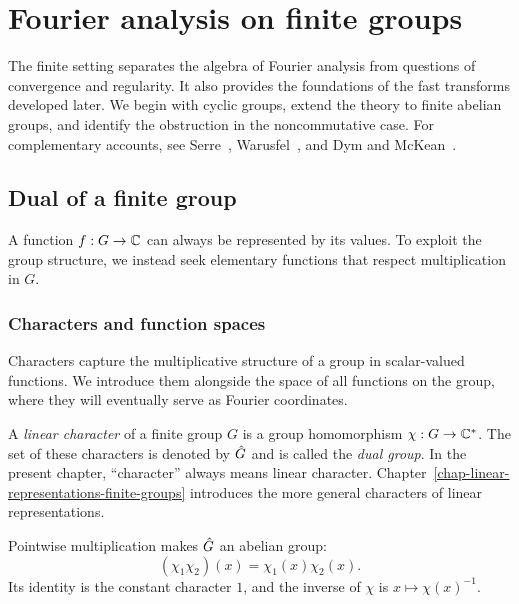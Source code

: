 \chapter{Fourier analysis on finite groups}
\label{chap-transforme-fourier-finite-group}

The finite setting separates the algebra of Fourier analysis from questions
of convergence and regularity. It also provides the foundations of the fast
transforms developed later. We begin with cyclic groups, extend the theory to
finite abelian groups, and identify the obstruction in the noncommutative case.
For complementary accounts, see Serre~\cite{serre},
Warusfel~\cite{warusfel}, and Dym and McKean~\cite{dym}.

\section{Dual of a finite group}
\label{sect1-dual-group}
A function $f:G\to\mathbb{C}$ can always be represented by its values. To exploit the
group structure, we instead seek elementary functions that respect
multiplication in $G$.

\subsection{Characters and function spaces}

Characters capture the multiplicative structure of a group in scalar-valued
functions. We introduce them alongside the space of all functions on the
group, where they will eventually serve as Fourier coordinates.

\begin{defn}
\label{notation-0}\label{notation-1}
A \emph{linear character} of a finite group $G$ is a group homomorphism
$\chi:G\to\mathbb{C}^*$. The set of these characters is denoted by $\hat{G}$ and is
called the \emph{dual group}. In the present chapter, ``character'' always means
linear character. Chapter~\ref{chap-linear-representations-finite-groups}
introduces the more general characters of linear representations.
\end{defn}
Pointwise multiplication makes $\hat{G}$ an abelian group:
\[
 (\chi_1\chi_2)(x)=\chi_1(x)\chi_2(x).
\]
Its identity is the constant character $1$, and the inverse of $\chi$ is
$x\mapsto\chi(x)^{-1}$.

